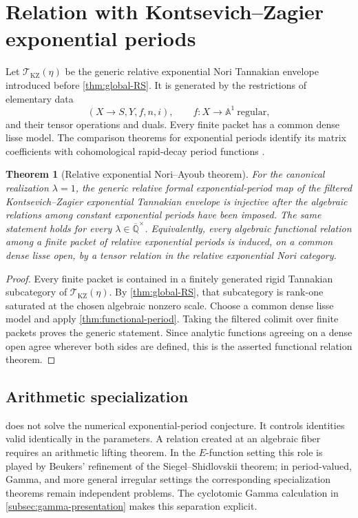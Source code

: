 \documentclass[11pt]{article}
\numberwithin{equation}{section}
\newtheorem{theorem}{Theorem}[section]
\theoremstyle{definition}
\theoremstyle{remark}
\newcommand{\Q}{\mathbb Q}
\newcommand{\Tcal}{\mathcal T}
\newcommand{\Aone}{\mathbb A^1}
\begin{document}
\section{Relation with Kontsevich--Zagier exponential periods}\label{sec:KZ}

Let $\Tcal_{\mathrm{KZ}}(\eta)$ be the generic relative exponential Nori
Tannakian envelope introduced before \cref{thm:global-RS}.  It is generated by
the restrictions of elementary data
\[
  (X\to S,Y,f,n,i),
  \qquad f:X\to\Aone\ \text{regular},
\]
and their tensor operations and duals.  Every finite packet has a common dense
lisse model.  The comparison theorems for exponential periods identify its
matrix coefficients with cohomological rapid-decay period functions
\cite{CHH,FresanJossenExp}.

\begin{theorem}[Relative exponential Nori--Ayoub theorem]
\label{thm:exponential-NA}
For the canonical realization $\lambda=1$, the generic relative formal
exponential-period map of the filtered Kontsevich--Zagier exponential
Tannakian envelope is injective after the algebraic relations among constant
exponential periods have been imposed.  The same statement holds for every
$\lambda\in\overline{\Q}^{\times}$.  Equivalently, every algebraic functional
relation among a finite packet of relative exponential periods is induced, on
a common dense lisse open, by a tensor relation in the relative exponential
Nori category.
\end{theorem}

\begin{proof}
Every finite packet is contained in a finitely generated rigid Tannakian
subcategory of $\Tcal_{\mathrm{KZ}}(\eta)$.  By \cref{thm:global-RS}, that
subcategory is rank-one saturated at the chosen algebraic nonzero scale.  Choose
a common dense lisse model and apply \cref{thm:functional-period}.  Taking the filtered colimit over
finite packets proves the generic statement.  Since analytic functions agreeing
on a dense open agree wherever both sides are defined, this is the asserted
functional relation theorem.
\end{proof}

\subsection{Arithmetic specialization}

 does not solve the numerical exponential-period
conjecture.  It controls identities valid identically in the parameters.  A
relation created at an algebraic fiber requires an arithmetic lifting theorem.
In the $E$-function setting this role is played by Beukers' refinement of the
Siegel--Shidlovskii theorem; in period-valued, Gamma, and more general irregular
settings the corresponding specialization theorems remain independent problems.
The cyclotomic Gamma calculation in \cref{subsec:gamma-presentation} makes this
separation explicit.
\end{document}

